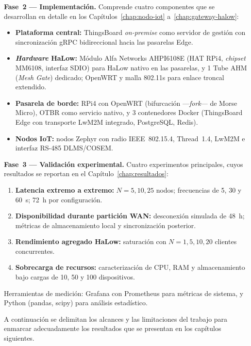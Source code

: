 \textbf{Fase~2 --- Implementación.} Comprende cuatro componentes que se desarrollan en detalle en los Capítulos~\ref{chap:nodo-iot} a~\ref{chap:gateway-halow}:
\begin{itemize}
    \item \textbf{Plataforma central:} ThingsBoard \emph{on-premise} como servidor de gestión con sincronización gRPC bidireccional hacia las pasarelas Edge.
    \item \textbf{\emph{Hardware} HaLow:} Módulo Alfa Networks AHPI6108E (HAT RPi4, \emph{chipset} MM6108, interfaz SDIO) para HaLow nativo en las pasarelas, y 1 Tube AHM (\emph{Mesh Gate}) dedicado; OpenWRT y malla 802.11s para enlace troncal extendido.
    \item \textbf{Pasarela de borde:} RPi4 con OpenWRT (bifurcación ---\emph{fork}--- de Morse Micro), OTBR como servicio nativo, y 3 contenedores Docker (ThingsBoard Edge con transporte LwM2M integrado, PostgreSQL, Redis).
    \item \textbf{Nodos IoT:} nodos Zephyr con radio IEEE~802.15.4, Thread~1.4, LwM2M e interfaz RS-485 DLMS/COSEM.
\end{itemize}


\textbf{Fase~3 --- Validación experimental.} Cuatro experimentos principales, cuyos resultados se reportan en el Capítulo~\ref{chap:resultados}:
\begin{enumerate}
    \item \textbf{Latencia extremo a extremo:} $N = 5, 10, 25$ nodos; frecuencias de 5, 30 y 60~s; 72~h por configuración.
    \item \textbf{Disponibilidad durante partición WAN:} desconexión simulada de 48~h; métricas de almacenamiento local y sincronización posterior.
    \item \textbf{Rendimiento agregado HaLow:} saturación con $N = 1, 5, 10, 20$ clientes concurrentes.
    \item \textbf{Sobrecarga de recursos:} caracterización de CPU, RAM y almacenamiento bajo cargas de 10, 50 y 100 dispositivos.
\end{enumerate}

Herramientas de medición: Grafana con Prometheus para métricas de sistema, y Python (pandas, scipy) para análisis estadístico.

A continuación se delimitan los alcances y las limitaciones del trabajo para enmarcar adecuadamente los resultados que se presentan en los capítulos siguientes.


